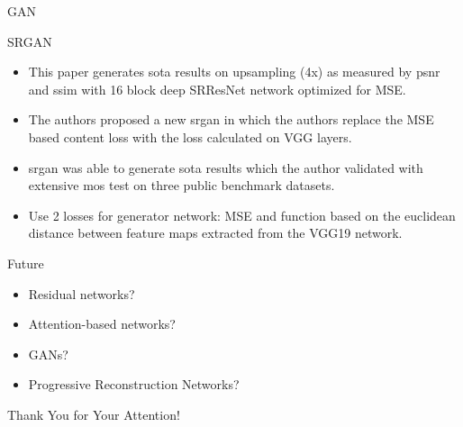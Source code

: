 \documentclass[hyperref={unicode}, xcolor=dvipsnames, t]{beamer}
\begin{document}
\begin{frame}{GAN}
\end{frame}

\begin{frame}{SRGAN}
    \begin{itemize}
        \item This paper generates \gls{sota} results on upsampling (4x) as measured by \gls{psnr} and \gls{ssim} with 16 block deep SRResNet network optimized for MSE.
        \item The authors proposed a new \gls{srgan} in which the authors replace the MSE based content loss with the loss calculated on VGG layers.
        \item \gls{srgan} was able to generate \gls{sota} results which the author validated with extensive \gls{mos} test on three public benchmark datasets.
        \item Use 2 losses for generator network: MSE and function based on the euclidean distance  between feature maps extracted from the VGG19 network.
    \end{itemize}
\end{frame}

\begin{frame}{Future}
    \begin{itemize}
        \item Residual networks?
        \item Attention-based networks?
        \item GANs?
        \item Progressive Reconstruction Networks?
    \end{itemize}
\end{frame}

\begin{frame}[plain]
\vfill
\centerline{Thank You for Your Attention!}
\vfill\vfill
\end{frame}

\section{\bibname}
\begin{frame}[t, allowframebreaks]{\bibname}
\printbibliography[heading=none]
\end{frame}



\printglossary[type=\acronymtype]
\end{document}
